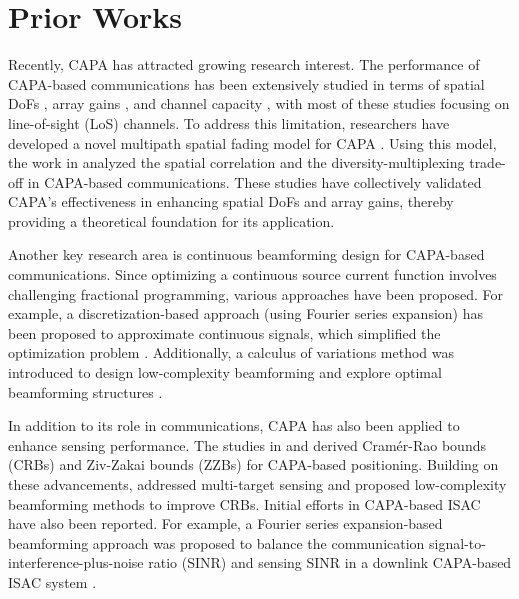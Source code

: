 \section{Prior Works}
\label{Section: Prior Works}
Recently, CAPA has attracted growing research interest. The performance of CAPA-based communications has been extensively studied in terms of spatial DoFs \cite{pizzo2022nyquist,do2023parabolic,wang2025analytical}, array gains \cite{ouyang2024impact,ouyang2024primer}, and channel capacity \cite{zhao2024continuous}, with most of these studies focusing on line-of-sight (LoS) channels. To address this limitation, researchers have developed a novel multipath spatial fading model for CAPA \cite{pizzo2022spatial}. Using this model, the work in \cite{per5} analyzed the spatial correlation and the diversity-multiplexing trade-off in CAPA-based communications. These studies have collectively validated CAPA's effectiveness in enhancing spatial DoFs and array gains, thereby providing a theoretical foundation for its application.

Another key research area is continuous beamforming design for CAPA-based communications. Since optimizing a continuous source current function involves challenging fractional programming, various approaches have been proposed. For example, a discretization-based approach (using Fourier series expansion) has been proposed to approximate continuous signals, which simplified the optimization problem \cite{opt1,opt2}. Additionally, a calculus of variations method was introduced to design low-complexity beamforming \cite{opt5} and explore optimal beamforming structures \cite{opt4,per7}.

In addition to its role in communications, CAPA has also been applied to enhance sensing performance. The studies in \cite{chen2023cramer} and \cite{chen2024near} derived Cram{\'e}r-Rao bounds (CRBs) and Ziv-Zakai bounds (ZZBs) for CAPA-based positioning. Building on these advancements, \cite{jiang2024cram} addressed multi-target sensing and proposed low-complexity beamforming methods to improve CRBs. Initial efforts in CAPA-based ISAC have also been reported. For example, a Fourier series expansion-based beamforming approach was proposed to balance the communication signal-to-interference-plus-noise ratio (SINR) and sensing SINR in a downlink CAPA-based ISAC system \cite{capa_isac}.